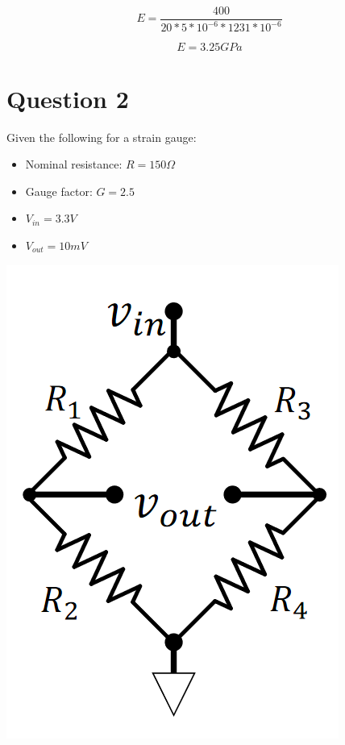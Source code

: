 \documentclass{article}
\begin{document}
\begin{equation*}
    E = \frac{400}{20 * 5 * 10^{-6} * 1231 * 10^{-6}}
\end{equation*}


\begin{equation*}
    E = 3.25 G Pa
\end{equation*}


\section*{Question 2}

Given the following for a strain gauge:
\begin{itemize}
    \item Nominal resistance: $R = 150 \Omega$
    \item Gauge factor: $G = 2.5$
    \item $V_{in} = 3.3 V$
    \item $V_{out} = 10mV$
\end{itemize}

\begin{center}
    \includegraphics*[scale=0.5]{straingauge.png}
\end{center}
\end{document}
